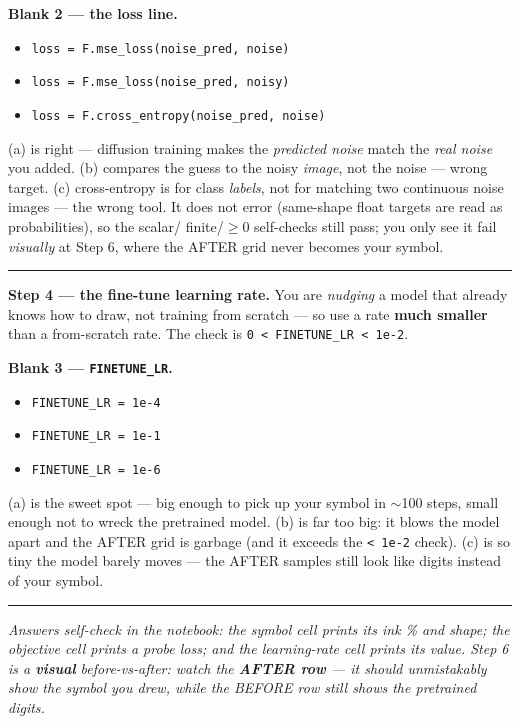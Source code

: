 \documentclass[11pt]{article}
\newcommand{\opt}[1]{\texttt{#1}}
\begin{document}
\textbf{Blank 2 --- the loss line.}
\begin{itemize}
  \item[(a)] \opt{loss = F.mse\_loss(noise\_pred, noise)}
  \item[(b)] \opt{loss = F.mse\_loss(noise\_pred, noisy)}
  \item[(c)] \opt{loss = F.cross\_entropy(noise\_pred, noise)}
\end{itemize}
{\small (a) is right --- diffusion training makes the \emph{predicted noise} match the \emph{real
noise} you added. (b) compares the guess to the noisy \emph{image}, not the noise --- wrong target.
(c) cross-entropy is for class \emph{labels}, not for matching two continuous noise images — the
wrong tool. It does not error (same-shape float targets are read as probabilities), so the scalar/
finite/$\geq 0$ self-checks still pass; you only see it fail \emph{visually} at Step 6, where the
AFTER grid never becomes your symbol.}

\vspace{3pt}\hrule\vspace{4pt}

\textbf{Step 4 --- the fine-tune learning rate.}\; {\small You are \emph{nudging} a model that
already knows how to draw, not training from scratch --- so use a rate \textbf{much smaller} than a
from-scratch rate. The check is \opt{0 < FINETUNE\_LR < 1e-2}.}

\textbf{Blank 3 --- \texttt{FINETUNE\_LR}.}
\begin{itemize}
  \item[(a)] \opt{FINETUNE\_LR = 1e-4}
  \item[(b)] \opt{FINETUNE\_LR = 1e-1}
  \item[(c)] \opt{FINETUNE\_LR = 1e-6}
\end{itemize}
{\small (a) is the sweet spot --- big enough to pick up your symbol in $\sim$100 steps, small enough
not to wreck the pretrained model. (b) is far too big: it blows the model apart and the AFTER grid is
garbage (and it exceeds the \opt{< 1e-2} check). (c) is so tiny the model barely moves --- the AFTER
samples still look like digits instead of your symbol.}

\vspace{4pt}\hrule\vspace{3pt}
{\small\itshape Answers self-check in the notebook: the symbol cell prints its ink \% and shape; the
objective cell prints a probe loss; and the learning-rate cell prints its value. Step 6 is a
\textbf{visual} before-vs-after: watch the \textbf{AFTER row} --- it should unmistakably show the
symbol \emph{you} drew, while the BEFORE row still shows the pretrained digits.}
\end{document}
